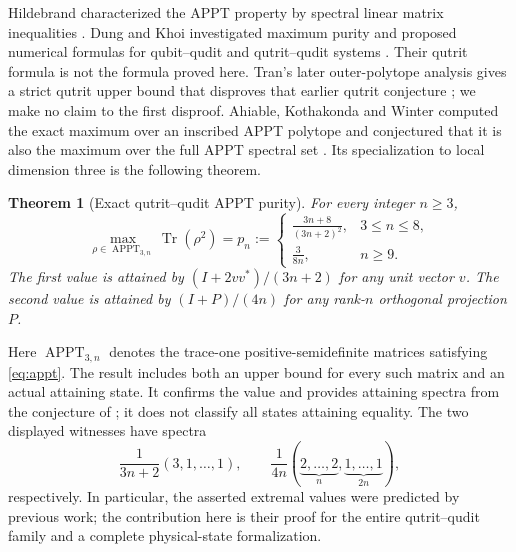 \documentclass[11pt]{article}
\newtheorem{theorem}{Theorem}[section]
\theoremstyle{remark}\newtheorem{remark}[theorem]{Remark}
\newcommand{\Tr}{\operatorname{Tr}}
\newcommand{\APPT}{\operatorname{APPT}}
\begin{document}
Hildebrand characterized the APPT property by spectral linear matrix inequalities \cite{Hildebrand}. Dung and Khoi investigated maximum purity and proposed numerical formulas for qubit--qudit and qutrit--qudit systems \cite{DungKhoi}. Their qutrit formula is not the formula proved here. Tran's later outer-polytope analysis gives a strict qutrit upper bound that disproves that earlier qutrit conjecture \cite{Tran}; we make no claim to the first disproof. Ahiable, Kothakonda and Winter computed the exact maximum over an inscribed APPT polytope and conjectured that it is also the maximum over the full APPT spectral set \cite[Theorem 6.3, Corollary 6.4 and Conjecture 6.7]{AKW}. Its specialization to local dimension three is the following theorem.

\begin{theorem}[Exact qutrit--qudit APPT purity]\label{thm:main}
For every integer $n\geq3$,
\begin{equation}\label{eq:maximum}
 \max_{\rho\in\APPT_{3,n}}\Tr(\rho^2)
 =p_n:={\begin{cases}
 \displaystyle\frac{3n+8}{(3n+2)^2},&3\leq n\leq8,\\[6pt]
 \displaystyle\frac{3}{8n},&n\geq9.
 \end{cases}}
\end{equation}
The first value is attained by $(I+2vv^*)/(3n+2)$ for any unit vector $v$. The second value is attained by $(I+P)/(4n)$ for any rank-$n$ orthogonal projection $P$.
\end{theorem}

Here $\APPT_{3,n}$ denotes the trace-one positive-semidefinite matrices satisfying \eqref{eq:appt}. The result includes both an upper bound for every such matrix and an actual attaining state. It confirms the value and provides attaining spectra from the conjecture of \cite{AKW}; it does not classify all states attaining equality. The two displayed witnesses have spectra
\begin{equation}\label{eq:witness-spectra}
 \frac{1}{3n+2}(3,1,\ldots,1),\qquad
 \frac{1}{4n}(\underbrace{2,\ldots,2}_{n},
                  \underbrace{1,\ldots,1}_{2n}),
\end{equation}
respectively. 
In particular, the asserted extremal values were predicted by previous work; the contribution here is their proof for the entire qutrit--qudit family and a complete physical-state formalization.
\end{document}
